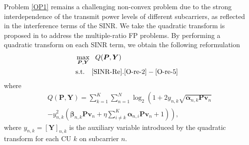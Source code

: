 \documentclass[a4paper,journal,10pt]{IEEEtran}
\begin{document}
Problem \eqref{OP1} remains a challenging non-convex problem due to the strong interdependence of the transmit power levels of different subcarriers, as reflected in the interference terms of the SINR. We take the quadratic transform is proposed in \cite{shen2018fractional} to address the multiple-ratio FP problems.
By performing a quadratic transform on each SINR term, we obtain the following reformulation
\begin{subequations}\label{OP2}
	\begin{align}
		&\max\limits_{\bm{P},\bm{Y}} \ \  Q(\bm{P},\bm{Y}) \\
		&\mathrm{s.t.}\quad \eqref{SINR-Re}. \eqref{O-re-2}-\eqref{O-re-5} 
	\end{align}
\end{subequations}
where
\begin{equation}
	\begin{aligned}
		& Q(\bm{P},\bm{Y})=\sum_{k=1}^{K} \sum_{n=1}^{N}\log_2 \left(1+2 y_{n,k} \sqrt{\bm{\alpha}_{n,k} \bm{P}\bm{v}_n}\right. \\
		&\left.-y_{n,k}^2\left(\bm{\beta}_{n,k}\bm{P}\bm{v}_n+\eta\sum_{i \neq k}^{K}\bm{\alpha}_{n,i} \bm{P}\bm{v}_n+1\right)\right),
	\end{aligned}
\end{equation}
where $y_{n,k} =[\bm{Y}]_{n,k}$ is the auxiliary variable introduced by the quadratic transform for each CU $k$ on subcarrier $n$.
\end{document}
